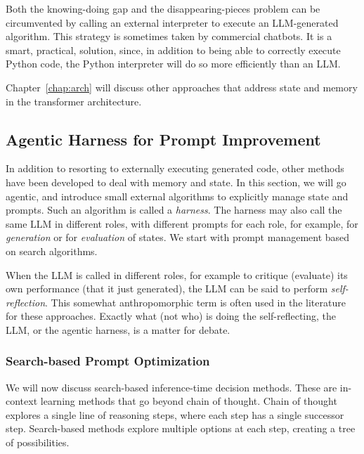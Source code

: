 Both the knowing-doing gap and the disappearing-pieces problem can be circumvented by calling an external interpreter to execute an LLM-generated algorithm. This strategy is sometimes taken by commercial chatbots. It is a smart, practical,  solution, since, in addition to being able to correctly execute Python code, the Python interpreter will do so more efficiently than an LLM. 

Chapter~\ref{chap:arch} will discuss other approaches that address state and memory in the transformer architecture. 

\subsection{Agentic Harness for Prompt Improvement}\label{sec:self-reflection}\label{sec:inferencetime}

In addition to resorting to externally executing generated code, other methods have been developed to deal with memory and state. In this section, we will %
go agentic, and introduce small external algorithms to explicitly manage state and prompts. Such an algorithm is called a {\em harness}. The harness may also call the same LLM in different roles, with different prompts for each role, for example, for {\em generation} or for {\em evaluation} of states. We start with prompt management based on search algorithms. 

When the LLM is called in different roles, for example to critique (evaluate) its own performance (that it just generated), the LLM can be said  to perform {\em self-reflection}. This somewhat anthropomorphic term is often used in the literature for these approaches. Exactly what (not who) is doing the self-reflecting, the LLM, or the agentic harness, is a matter for debate.


\subsubsection{Search-based Prompt Optimization}\label{sec:planning}
We will now discuss search-based inference-time decision methods.
These are in-context learning methods that go beyond chain of thought. Chain of thought explores a single line of reasoning steps, where each step has a single successor step. Search-based methods  explore multiple options at each step, creating a tree of possibilities. 

